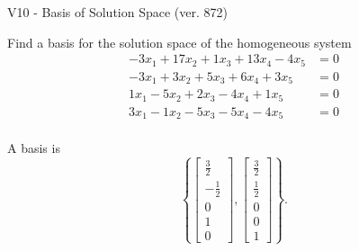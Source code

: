 \begin{exercise}
  \begin{exerciseTitle}V10 - Basis of Solution Space (ver. 872)\end{exerciseTitle}
  \begin{exerciseStatement}
    Find a basis for the solution space of the homogeneous system 
\begin{align*}
 -3 x_ 1 + 17 x_ 2 + 1 x_ 3 + 13 x_ 4 -4 x_ 5 &= 0  \\ 
  -3 x_ 1 + 3 x_ 2 + 5 x_ 3 + 6 x_ 4 + 3 x_ 5 &= 0  \\ 
  1 x_ 1 -5 x_ 2 + 2 x_ 3 -4 x_ 4 + 1 x_ 5 &= 0  \\ 
  3 x_ 1 -1 x_ 2 -5 x_ 3 -5 x_ 4 -4 x_ 5 &= 0  \\ 
 \end{align*}


 
  \end{exerciseStatement}

  \begin{exerciseAnswer}
   A basis is   
\[\left\{\left[\begin{array}{c}
\frac{3}{2} \\
-\frac{1}{2} \\
0 \\
1 \\
0
\end{array}\right] , \left[\begin{array}{c}
\frac{3}{2} \\
\frac{1}{2} \\
0 \\
0 \\
1
\end{array}\right]\right\}.\]

  


  \end{exerciseAnswer}
\end{exercise}